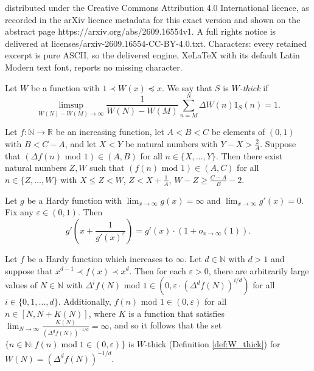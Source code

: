 \documentclass[10pt,a4paper]{amsart}
\newcommand{\N}{\mathbb{N}}
\newcommand{\R}{\mathbb{R}}
\renewcommand{\epsilon}{\varepsilon}
\renewcommand{\geq}{\geqslant}
\renewcommand{\leq}{\leqslant}
\renewcommand{\mod}{\operatorname{mod}}
\newcommand{\oo}{\infty}
\begin{document}
distributed under the Creative Commons Attribution 4.0 International licence, as recorded in the arXiv licence metadata for this exact version and shown on the abstract page https://arxiv.org/abs/2609.16554v1. A full rights notice is delivered at licenses/arxiv-2609.16554-CC-BY-4.0.txt. Characters: every retained excerpt is pure ASCII, so the delivered engine, XeLaTeX with its default Latin Modern text font, reports no missing character.
\begin{definition}\label{def:W_thick}
    Let $W$ be a function with $1\prec W(x)\preceq x$. We say that $S$ is $W$\emph{-thick} if 
    \begin{equation}
        \limsup_{W(N)-W(M)\to\oo}\frac{1}{W(N)-W(M)}\sum_{n=M}^N\Delta W(n)1_{S}(n)=1.
    \end{equation}
\end{definition}

\begin{lemma}\label{lem:technical_1}
    Let $f: \N\rightarrow \R$ be an increasing function, let $A<B<C$ be elements of $(0,1)$ with $B<C-A$, and let $X<Y$ be natural numbers with $Y-X> \frac{2}{A}$. Suppose that $(\Delta f(n)\text{ mod } 1)\in (A,B)$ for all $n\in \{X,\dots, Y\}$. Then there exist natural numbers $Z,W$  such that $ (f(n)\text{ mod } 1)\in (A,C)$ for all $n\in \{Z,\dots, W\}$ with $X\leq Z<W$, $Z< X+\frac{1}{A}$, $W-Z\geq \frac{C-A}{B}-2$.
\end{lemma}

\begin{lemma}\label{lem:shift_inequality}
    Let $g$ be a Hardy function with $\lim_{x\to\oo}g(x)=\oo$ and $\lim_{x\to\oo}g'(x)=0$. Fix any $\epsilon\in (0,1)$. Then
\begin{equation}\label{eq:shift_inequality}
        g'\left(x+\frac{1}{g'(x)^{\epsilon}}\right)=g'(x) \cdot (1+o_{x\to\oo}(1)). 
    \end{equation}
\end{lemma}

\begin{lemma}\label{lem:derivatives_mod_1}
 Let $f$ be a Hardy function which increases to $\oo$. Let $d\in \N$ with $d>1$ and suppose that $x^{d-1}\prec f(x) \prec x^{d}$. 
 Then for each $\epsilon>0$, there are arbitrarily large values of $N\in \N$ with $\Delta^{i}f(N)\text{ mod } 1\in (0,\epsilon\cdot (\Delta^{d}f(N))^{i/d})$ for all $i\in\{0,1,\dots, d\}$. Additionally, $f(n)\text{ mod } 1\in (0,\epsilon)$ for all $n\in [N,N+K(N)]$, where $K$ is a function that satisfies $\lim_{N\to\oo}\frac{K(N)}{(\Delta^{d} f(N))^{-1/d}}=\oo$, and so it follows that the set $\{n\in \N: f(n)\mod 1\in (0,\epsilon)\}$ is $W$-thick (Definition \ref{def:W_thick}) for $W(N) = (\Delta^{d} f(N))^{-1/d}$.
\end{lemma}
\end{document}
